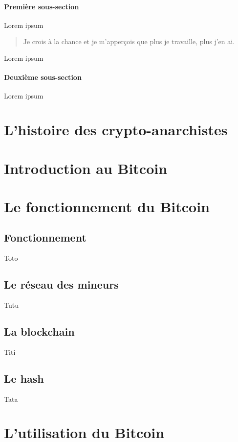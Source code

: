 \documentclass{bredele} %
\begin{document}
    \subsection{Première sous-section}

    Lorem ipsum

    \begin{quote}
        Je crois à la chance et je m'apperçois que plus je travaille, plus j'en ai.
    \end{quote}

    Lorem ipsum

    \subsection{Deuxième sous-section}

    Lorem ipsum

    \part[L'histoire du digital et des crypyo-anarchiste]{L'histoire des crypto-anarchistes}

    \part[Les cypto-monnaie \& le Bitcoin]{Introduction au Bitcoin}

    \part[Le fonctionnement du Bitcoin]{Le fonctionnement du Bitcoin}
    \chapter[Fonctionnement]{Fonctionnement}
    Toto
    \chapter[Le réseau des mineurs]{Le réseau des mineurs}
    Tutu
    \chapter[Le blockchain]{La blockchain}
    Titi
    \chapter[Le hash]{Le hash}
    Tata

    \part[L'utilisation du Bitcoin]{L'utilisation du Bitcoin}
\end{document}
